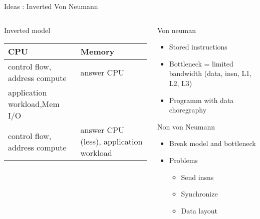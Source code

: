 
\begin{Frame}{Ideas : Inverted Von Neumann}
  \begin{columns}[t]
	\begin{column}{\BW}
      \begin{block}{Inverted model}
      \end{block}
      \begin{block}{}
{\footnotesize  \begin{tabular}{|p{2.8cm}|p{2.8cm}|}\hline
\rowcolor{green}        CPU                   & Memory \\\hline
\cellcolor{red} control flow, address compute & answer CPU          \\
\cellcolor{red} application workload,Mem I/O  & \\ \hline
\cellcolor{green} control flow, address compute & \cellcolor{green}answer CPU (less), application workload\\\hline
         \end{tabular}
}
      \end{block}

        
        
	\end{column}

	\begin{column}{\BW}
      \begin{block}{Von neuman}
        \begin{itemize}
        \item Stored instructions
        \item Bottleneck = limited bandwidth (data, insn, L1, L2, L3)
        \item Programm with data choregraphy
        \end{itemize}
      \end{block}
      \begin{block}{Non von Neumann}
        \begin{itemize}
        \item Break model and bottleneck
        \item Problems
          \begin{itemize}
          \item Send insns
          \item Synchronize
          \item Data layout
          \end{itemize}
        \end{itemize}
      \end{block}
	\end{column}
  \end{columns}
\end{Frame}

